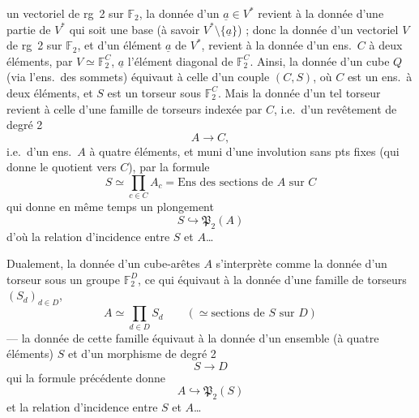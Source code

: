 \documentclass[11pt,a4paper]{article}
\begin{document}
un vectoriel  de rg~2 sur $\mathbb{F}_2$, la donnée d'un
$\underline{a} \in V^{*}$ revient à la donnée d'une partie de $V^{*}$ qui soit
une base (à savoir $V^{*} \setminus \{\underline{a}\}$) ; donc la donnée d'un
 vectoriel $V$ de rg~2 sur
$\mathbb{F}_2$, et d'un élément $\underline{a}$ de $V^{*}$, revient à la donnée
d'un ens.\ $C$ à deux éléments, par $V \simeq \mathbb{F}_2^{C}$,
$\underline{a}$ l'élément diagonal de $\mathbb{F}_2^{C}$. Ainsi, la donnée
d'un cube $Q$ \struck{\ill{} \ill{}} (via l'ens.\ des sommets) équivaut à
celle d'un couple $(C, S)$, où $C$ \struck{\ill{}} est un ens.\ à deux
éléments, et $S$ est un torseur sous $\mathbb{F}_2^{C}$. Mais la donnée d'un
tel torseur revient à celle d'une famille de torseurs
indexée par $C$, i.e.\ d'un revêtement de degré 2
\[
  A \longrightarrow C,
\]
 i.e.\ d'un ens.\ $A$ à quatre éléments, et muni d'une
involution sans pts fixes (qui donne le quotient vers $C$), par la formule
\[
  S \simeq \prod_{c \in C} A_c = \text{Ens des sections de } A
  \text{ sur } C
\]
qui donne en même temps un plongement
\[
  S \hookrightarrow \mathfrak{P}_2(A)
\]
d'où la relation d'incidence entre $S$ et $A$\ldots
{}

Dualement,  la donnée d'un cube-arêtes
$A$ s'interprète comme la donnée d'un torseur sous un groupe
$\mathbb{F}_2^{D}$, ce qui équivaut à la donnée d'une famille de
torseurs $(S_d)_{d \in D}$, 
\[
  A \simeq \prod_{d \in D} S_d \qquad (\simeq \text{sections de } S \text{ sur } D)
\]
--- la donnée de cette famille équivaut à la donnée d'un ensemble (à quatre
éléments) $S$ et d'un morphisme de degré 2
\[
  S \longrightarrow D
\]
qui \ill{} la formule précédente donne
\[
  A \hookrightarrow \mathfrak{P}_2(S)
\]
et la relation d'incidence entre $S$ et $A$\ldots
{}
\end{document}
